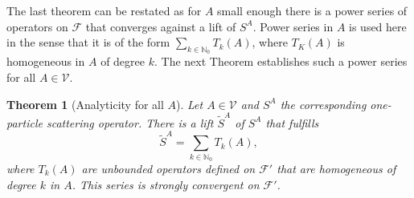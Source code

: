 \documentclass[b5paper,draft,openbib,12pt]{memoir}
\newtheorem{Thm}[Def]{Theorem}
\begin{document}
The last theorem can be restated as for \(A\) small enough 
there is a power series of operators on \(\mathcal{F}\)
that converges against a lift of \(S^A\). Power series in \(A\) 
is used here in the sense that it is of the form 
\(\sum_{k\in\mathbb{N}_0} T_k(A)\), where \(T_K(A)\) is 
homogeneous in \(A\) of degree \(k\). The next Theorem 
establishes such a power series for all \(A\in\mathcal{V}\).

\begin{Thm}[Analyticity for all \(A\)]
  Let \(A\in\mathcal{V}\) and \(S^A\) the corresponding one-particle 
  scattering operator. There is a lift \(\tilde{S}^A\) of \(S^A\)
  that fulfills 
\begin{equation}
  \tilde{S}^A=\sum_{k\in\mathbb{N}_0} T_k(A),
\end{equation}
  where \(T_k(A)\) are unbounded operators defined on 
  \(\mathcal{F}'\) that are homogeneous of degree \(k\) in \(A\).
  This series is strongly convergent on \(\mathcal{F}'\).
\end{Thm}
\end{document}
